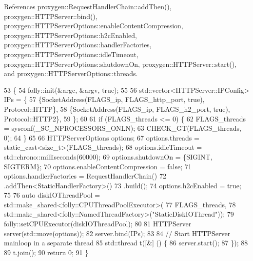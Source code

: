 References proxygen\+::\+Request\+Handler\+Chain\+::add\+Then(), proxygen\+::\+H\+T\+T\+P\+Server\+::bind(), proxygen\+::\+H\+T\+T\+P\+Server\+Options\+::enable\+Content\+Compression, proxygen\+::\+H\+T\+T\+P\+Server\+Options\+::h2c\+Enabled, proxygen\+::\+H\+T\+T\+P\+Server\+Options\+::handler\+Factories, proxygen\+::\+H\+T\+T\+P\+Server\+Options\+::idle\+Timeout, proxygen\+::\+H\+T\+T\+P\+Server\+Options\+::shutdown\+On, proxygen\+::\+H\+T\+T\+P\+Server\+::start(), and proxygen\+::\+H\+T\+T\+P\+Server\+Options\+::threads.


\begin{DoxyCode}
53                                  \{
54   folly::init(&argc, &argv, \textcolor{keyword}{true});
55 
56   std::vector<HTTPServer::IPConfig> IPs = \{
57     \{SocketAddress(FLAGS\_ip, FLAGS\_http\_port, \textcolor{keyword}{true}), Protocol::HTTP\},
58     \{SocketAddress(FLAGS\_ip, FLAGS\_h2\_port, \textcolor{keyword}{true}), Protocol::HTTP2\},
59   \};
60 
61   \textcolor{keywordflow}{if} (FLAGS\_threads <= 0) \{
62     FLAGS\_threads = sysconf(\_SC\_NPROCESSORS\_ONLN);
63     CHECK\_GT(FLAGS\_threads, 0);
64   \}
65 
66   HTTPServerOptions options;
67   options.threads = \textcolor{keyword}{static\_cast<}\textcolor{keywordtype}{size\_t}\textcolor{keyword}{>}(FLAGS\_threads);
68   options.idleTimeout = std::chrono::milliseconds(60000);
69   options.shutdownOn = \{SIGINT, SIGTERM\};
70   options.enableContentCompression = \textcolor{keyword}{false};
71   options.handlerFactories = RequestHandlerChain()
72       .addThen<StaticHandlerFactory>()
73       .build();
74   options.h2cEnabled = \textcolor{keyword}{true};
75 
76   \textcolor{keyword}{auto} diskIOThreadPool = std::make\_shared<folly::CPUThreadPoolExecutor>(
77     FLAGS\_threads,
78     std::make\_shared<folly::NamedThreadFactory>(\textcolor{stringliteral}{"StaticDiskIOThread"}));
79   folly::setCPUExecutor(diskIOThreadPool);
80 
81   HTTPServer server(std::move(options));
82   server.bind(IPs);
83 
84   \textcolor{comment}{// Start HTTPServer mainloop in a separate thread}
85   std::thread t([&] () \{
86     server.start();
87   \});
88 
89   t.join();
90   \textcolor{keywordflow}{return} 0;
91 \}
\end{DoxyCode}
